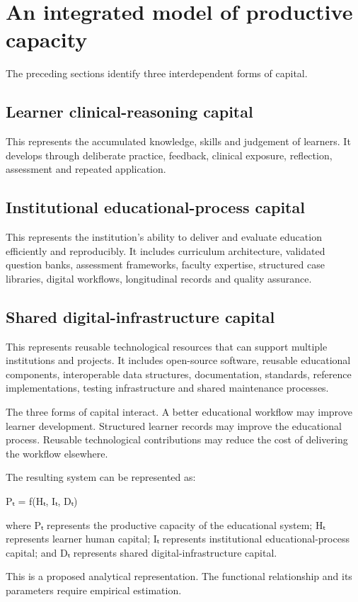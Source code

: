 \documentclass[11pt,a4paper]{article}
\begin{document}
\section{An integrated model of productive capacity}
The preceding sections identify three interdependent forms of capital.

\subsection{Learner clinical-reasoning capital}
This represents the accumulated knowledge, skills and judgement of learners. It develops through deliberate practice, feedback, clinical exposure, reflection, assessment and repeated application.

\subsection{Institutional educational-process capital}
This represents the institution's ability to deliver and evaluate education efficiently and reproducibly. It includes curriculum architecture, validated question banks, assessment frameworks, faculty expertise, structured case libraries, digital workflows, longitudinal records and quality assurance.

\subsection{Shared digital-infrastructure capital}
This represents reusable technological resources that can support multiple institutions and projects. It includes open-source software, reusable educational components, interoperable data structures, documentation, standards, reference implementations, testing infrastructure and shared maintenance processes.

The three forms of capital interact. A better educational workflow may improve learner development. Structured learner records may improve the educational process. Reusable technological contributions may reduce the cost of delivering the workflow elsewhere.

The resulting system can be represented as:

Pₜ = f(Hₜ, Iₜ, Dₜ)

where Pₜ represents the productive capacity of the educational system; Hₜ represents learner human capital; Iₜ represents institutional educational-process capital; and Dₜ represents shared digital-infrastructure capital.

This is a proposed analytical representation. The functional relationship and its parameters require empirical estimation.
\end{document}
